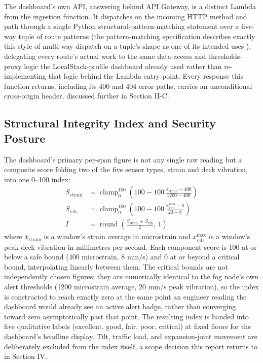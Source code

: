 \documentclass[conference]{IEEEtran}
\begin{document}
The dashboard's own API, answering behind API Gateway, is a distinct Lambda from the ingestion function. It dispatches on the incoming HTTP method and path through a single Python structural-pattern-matching statement over a five-way tuple of route patterns (the pattern-matching specification describes exactly this style of multi-way dispatch on a tuple's shape as one of its intended uses \cite{ref11}), delegating every route's actual work to the same data-access and thresholds-proxy logic the LocalStack-profile dashboard already used rather than re-implementing that logic behind the Lambda entry point. Every response this function returns, including its 400 and 404 error paths, carries an unconditional cross-origin header, discussed further in Section II-C.

\subsection{Structural Integrity Index and Security Posture}

The dashboard's primary per-span figure is not any single raw reading but a composite score folding two of the five sensor types, strain and deck vibration, into one 0--100 index:
\begin{align}
S_{\text{strain}} &= \operatorname{clamp}_{0}^{100}\!\left(100 - 100\,\frac{\bar{x}_{\text{strain}} - 400}{1200 - 400}\right) \\
S_{\text{vib}} &= \operatorname{clamp}_{0}^{100}\!\left(100 - 100\,\frac{x^{\max}_{\text{vib}} - 8}{20 - 8}\right) \\
I &= \operatorname{round}\!\left(\frac{S_{\text{strain}} + S_{\text{vib}}}{2},\,1\right)
\end{align}
where $\bar{x}_{\text{strain}}$ is a window's strain average in microstrain and $x^{\max}_{\text{vib}}$ is a window's peak deck vibration in millimetres per second. Each component score is 100 at or below a safe bound (400 microstrain, 8 mm/s) and 0 at or beyond a critical bound, interpolating linearly between them. The critical bounds are not independently chosen figures: they are numerically identical to the fog node's own alert thresholds (1200 microstrain average, 20 mm/s peak vibration), so the index is constructed to reach exactly zero at the same point an engineer reading the dashboard would already see an active alert badge, rather than converging toward zero asymptotically past that point. The resulting index is banded into five qualitative labels (excellent, good, fair, poor, critical) at fixed floors for the dashboard's headline display. Tilt, traffic load, and expansion-joint movement are deliberately excluded from the index itself, a scope decision this report returns to in Section IV.
\end{document}
